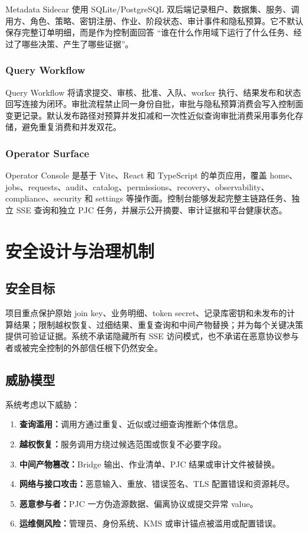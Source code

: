 \documentclass[UTF8,a4paper,12pt,oneside]{ctexrep}
\begin{document}
Metadata Sidecar 使用 SQLite/PostgreSQL 双后端记录租户、数据集、服务、调用方、角色、策略、密钥注册、作业、阶段状态、审计事件和隐私预算。它不默认保存完整订单明细，而是作为控制面回答 ``谁在什么作用域下运行了什么任务、经过了哪些决策、产生了哪些证据''。

\subsection{Query Workflow}

Query Workflow 将请求提交、审核、批准、入队、worker 执行、结果发布和状态回写连接为闭环。审批流程禁止同一身份自批，审批与隐私预算消费会写入控制面变更记录。默认发布路径对预算并发扣减和一次性近似查询审批消费采用事务化存储，避免重复消费和并发双花。

\subsection{Operator Surface}

Operator Console 是基于 Vite、React 和 TypeScript 的单页应用，覆盖 home、jobs、requests、audit、catalog、permissions、recovery、observability、compliance、security 和 settings 等操作面。控制台能够发起完整主链路任务、独立 SSE 查询和独立 PJC 任务，并展示公开摘要、审计证据和平台健康状态。

\chapter{安全设计与治理机制}

\section{安全目标}

项目重点保护原始 join key、业务明细、token secret、记录库密钥和未发布的计算结果；限制越权恢复、过细结果、重复查询和中间产物替换；并为每个关键决策提供可验证证据。系统不承诺隐藏所有 SSE 访问模式，也不承诺在恶意协议参与者或被完全控制的外部信任根下仍然安全。

\section{威胁模型}

系统考虑以下威胁：

\begin{enumerate}
  \item \textbf{查询滥用：}调用方通过重复、近似或过细查询推断个体信息。
  \item \textbf{越权恢复：}服务调用方绕过候选范围或恢复不必要字段。
  \item \textbf{中间产物篡改：}Bridge 输出、作业清单、PJC 结果或审计文件被替换。
  \item \textbf{网络与接口攻击：}恶意输入、重放、错误签名、TLS 配置错误和资源耗尽。
  \item \textbf{恶意参与者：}PJC 一方伪造源数据、偏离协议或提交异常 value。
  \item \textbf{运维侧风险：}管理员、身份系统、KMS 或审计锚点被滥用或配置错误。
\end{enumerate}
\end{document}
